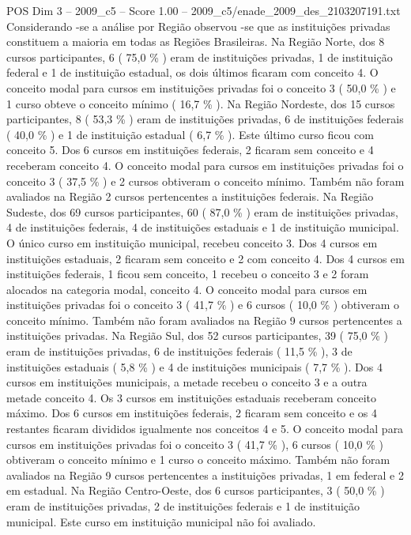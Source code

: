 \begin{textsample}{POS Dim 3 – 2009\_c5 – Score 1.00 – 2009\_c5/enade\_2009\_des\_2103207191.txt}
Considerando -se a análise por Região observou -se que as instituições privadas constituem a maioria em todas as Regiões Brasileiras.
Na Região Norte, dos 8 cursos participantes, 6 ( 75,0 \% ) eram de instituições privadas, 1 de instituição federal e 1 de instituição estadual, os dois últimos ficaram com conceito 4.
O conceito modal para cursos em instituições privadas foi o conceito 3 ( 50,0 \% ) e 1 curso obteve o conceito mínimo ( 16,7 \% ).
Na Região Nordeste, dos 15 cursos participantes, 8 ( 53,3 \% ) eram de instituições privadas, 6 de instituições federais ( 40,0 \% ) e 1 de instituição estadual ( 6,7 \% ).
Este último curso ficou com conceito 5.
Dos 6 cursos em instituições federais, 2 ficaram sem conceito e 4 receberam conceito 4.
O conceito modal para cursos em instituições privadas foi o conceito 3 ( 37,5 \% ) e 2 cursos obtiveram o conceito mínimo.
Também não foram avaliados na Região 2 cursos pertencentes a instituições federais.
Na Região Sudeste, dos 69 cursos participantes, 60 ( 87,0 \% ) eram de instituições privadas, 4 de instituições federais, 4 de instituições estaduais e 1 de instituição municipal.
O único curso em instituição municipal, recebeu conceito 3.
Dos 4 cursos em instituições estaduais, 2 ficaram sem conceito e 2 com conceito 4.
Dos 4 cursos em instituições federais, 1 ficou sem conceito, 1 recebeu o conceito 3 e 2 foram alocados na categoria modal, conceito 4.
O conceito modal para cursos em instituições privadas foi o conceito 3 ( 41,7 \% ) e 6 cursos ( 10,0 \% ) obtiveram o conceito mínimo.
Também não foram avaliados na Região 9 cursos pertencentes a instituições privadas.
Na Região Sul, dos 52 cursos participantes, 39 ( 75,0 \% ) eram de instituições privadas, 6 de instituições federais ( 11,5 \% ), 3 de instituições estaduais ( 5,8 \% ) e 4 de instituições municipais ( 7,7 \% ).
Dos 4 cursos em instituições municipais, a metade recebeu o conceito 3 e a outra metade conceito 4.
Os 3 cursos em instituições estaduais receberam conceito máximo.
Dos 6 cursos em instituições federais, 2 ficaram sem conceito e os 4 restantes ficaram divididos igualmente nos conceitos 4 e 5.
O conceito modal para cursos em instituições privadas foi o conceito 3 ( 41,7 \% ), 6 cursos ( 10,0 \% ) obtiveram o conceito mínimo e 1 curso o conceito máximo.
Também não foram avaliados na Região 9 cursos pertencentes a instituições privadas, 1 em federal e 2 em estadual.
Na Região Centro-Oeste, dos 6 cursos participantes, 3 ( 50,0 \% ) eram de instituições privadas, 2 de instituições federais e 1 de instituição municipal.
Este curso em instituição municipal não foi avaliado.

\end{textsample}
